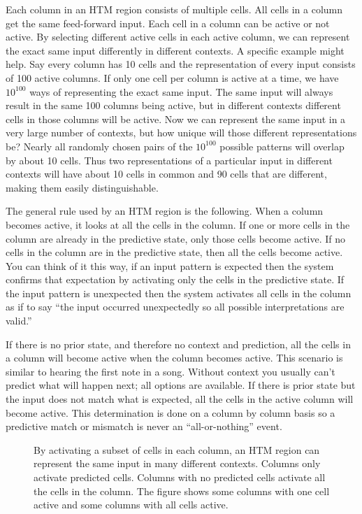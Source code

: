 \begin{enumerate}
Each column in an HTM region consists of multiple cells. All cells in
a column get the same feed-forward input. Each cell in a column can be
active or not active. By selecting different active cells in each
active column, we can represent the exact same input differently in
different contexts. A specific example might help. Say every column
has 10 cells and the representation of every input consists of 100
active columns. If only one cell per column is active at a time, we
have $10^{100}$ ways of representing the exact same input. The same
input will always result in the same 100 columns being active, but in
different contexts different cells in those columns will be
active. Now we can represent the same input in a very large number of
contexts, but how unique will those different representations be?
Nearly all randomly chosen pairs of the $10^{100}$ possible patterns
will overlap by about 10 cells. Thus two representations of a
particular input in different contexts will have about 10 cells in
common and 90 cells that are different, making them easily
distinguishable.

The general rule used by an HTM region is the following. When a column
becomes active, it looks at all the cells in the column. If one or
more cells in the column are already in the predictive state, only
those cells become active. If no cells in the column are in the
predictive state, then all the cells become active. You can think of
it this way, if an input pattern is expected then the system confirms
that expectation by activating only the cells in the predictive
state. If the input pattern is unexpected then the system activates
all cells in the column as if to say ``the input occurred unexpectedly
so all possible interpretations are valid.''

If there is no prior state, and therefore no context and prediction,
all the cells in a column will become active when the column becomes
active. This scenario is similar to hearing the first note in a
song. Without context you usually can't predict what will happen next;
all options are available. If there is prior state but the input does
not match what is expected, all the cells in the active column will
become active. This determination is done on a column by column basis
so a predictive match or mismatch is never an ``all-or-nothing''
event.

\begin{figure}
\caption{By activating a subset of cells in each column, an HTM region
  can represent the same input in many different contexts. Columns
  only activate predicted cells. Columns with no predicted cells
  activate all the cells in the column. The figure shows some columns
  with one cell active and some columns with all cells active.}
\label{figure:column-partial-activation}
\end{figure}


\end{enumerate}
